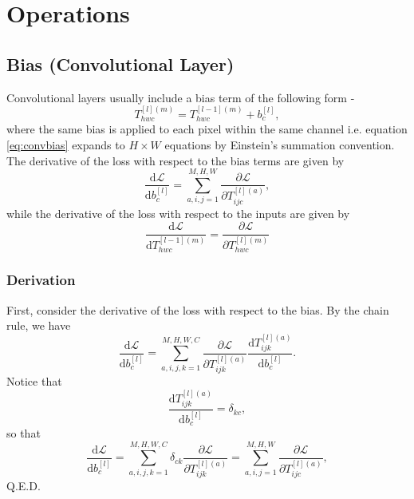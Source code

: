 \documentclass[modern]{aastex61}
\newcommand{\uderivative}{\mathrm{d}}
\begin{document}
\section{Operations} \label{sec:op}

\subsection{Bias (Convolutional Layer)} \label{sec:bias}

Convolutional layers usually include a bias term of the following form -
\begin{equation} \label{eq:convbias}
  T^{[l](m)}_{hwc} = T^{[l-1](m)}_{hwc} + b^{[l]}_{c},
\end{equation}
where the same bias is applied to each pixel within the same channel i.e. equation \eqref{eq:convbias} expands to $H \times W$ equations by Einstein's summation convention. The derivative of the loss with respect to the bias terms are given by
\begin{equation} \label{eq:gradconvbias}
  \frac{\uderivative \mathscr{L}}{\uderivative b^{[l]}_{c}} = \sum_{a, i, j = 1}^{M, H, W} \frac{\partial \mathscr{L}}{\partial T^{[l](a)}_{ijc}},
\end{equation}
while the derivative of the loss with respect to the inputs are given by
\begin{equation} \label{eq:propconvbias}
  \frac{\uderivative \mathscr{L}}{\uderivative T^{[l-1](m)}_{hwc}} = \frac{\partial \mathscr{L}}{\partial  T^{[l](m)}_{hwc}}
\end{equation}

\subsubsection{Derivation}
First, consider the derivative of the loss with respect to the bias. By the chain rule, we have
\begin{equation*}
  \frac{\uderivative \mathscr{L}}{\uderivative b^{[l]}_{c}} = \sum_{a, i, j, k = 1}^{M, H, W, C} \frac{\partial \mathscr{L}}{\partial T^{[l](a)}_{ijk}} \frac{\uderivative T^{[l](a)}_{ijk}}{\uderivative b^{[l]}_{c}}.
\end{equation*}
Notice that
\begin{equation*}
  \frac{\uderivative T^{[l](a)}_{ijk}}{\uderivative b^{[l]}_{c}} = \delta_{kc},
\end{equation*} so that
\begin{equation*}
  \frac{\uderivative \mathscr{L}}{\uderivative b^{[l]}_{c}} = \sum_{a, i, j, k = 1}^{M, H, W, C} \delta_{ck} \frac{\partial \mathscr{L}}{\partial T^{[l](a)}_{ijk}} = \sum_{a, i, j = 1}^{M, H, W} \frac{\partial \mathscr{L}}{\partial T^{[l](a)}_{ijc}},
\end{equation*}
Q.E.D.
\end{document}
